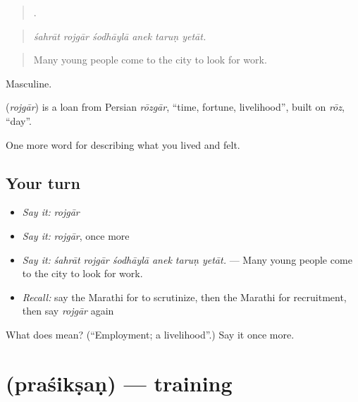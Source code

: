 \begin{quote}
     .
\end{quote}

\begin{quote}
\emph{śahrāt rojgār śodhāylā anek taruṇ yetāt.}
\end{quote}

\begin{quote}
Many young people come to the city to look for work.
\end{quote}

Masculine.

\begin{cousinweb}
\textbf{} (\emph{rojgār}) is a loan from Persian \emph{rōzgār}, \textquotedblleft{}time, fortune, livelihood\textquotedblright{}, built on \emph{rōz}, \textquotedblleft{}day\textquotedblright{}.
\end{cousinweb}

\begin{grammarlens}[title={What you've built}]
One more word for describing what you lived and felt.
\end{grammarlens}

\subsection*{Your turn}
\begin{itemize}
\raggedright
  \item \emph{Say it:} \emph{rojgār}
  \item \emph{Say it:} \emph{rojgār}, once more
  \item \emph{Say it:} \emph{śahrāt rojgār śodhāylā anek taruṇ yetāt.} — Many young people come to the city to look for work.
  \item \emph{Recall:} say the Marathi for to scrutinize, then the Marathi for recruitment, then say \emph{rojgār} again
\end{itemize}

\begin{tcolorbox}[breakable,colback=teal!4,colframe=teal!35!black,title={Before you move on}]
What does  mean? (\textquotedblleft{}Employment; a livelihood\textquotedblright{}.) Say it once more.
\end{tcolorbox}
\section[\texorpdfstring{\mr{प्रशिक्षण} (praśikṣaṇ)}{प्रशिक्षण (praśikṣaṇ)}]{ (praśikṣaṇ) — training}

